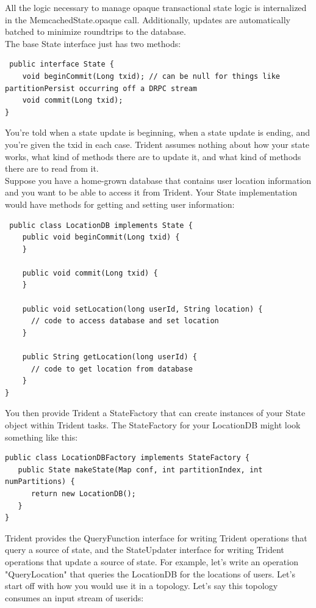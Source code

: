 All the logic necessary to manage opaque transactional state logic is internalized in the MemcachedState.opaque call. Additionally, updates are automatically batched to minimize roundtrips to the database.\\[2mm]
The base State interface just has two methods:\\[2mm]
\begin{verbatim}
 public interface State {
    void beginCommit(Long txid); // can be null for things like partitionPersist occurring off a DRPC stream
    void commit(Long txid);
}
\end{verbatim}
You're told when a state update is beginning, when a state update is ending, and you're given the txid in each case. Trident assumes nothing about how your state works, what kind of methods there are to update it, and what kind of methods there are to read from it.\\[2mm]Suppose you have a home-grown database that contains user location information and you want to be able to access it from Trident. Your State implementation would have methods for getting and setting user information:\\[2mm]
\begin{verbatim}
 public class LocationDB implements State {
    public void beginCommit(Long txid) {    
    }
    
    public void commit(Long txid) {    
    }
    
    public void setLocation(long userId, String location) {
      // code to access database and set location
    }
    
    public String getLocation(long userId) {
      // code to get location from database
    }
}
\end{verbatim}
You then provide Trident a StateFactory that can create instances of your State object within Trident tasks. The StateFactory for your LocationDB might look something like this:\\[2mm]
\begin{verbatim}
public class LocationDBFactory implements StateFactory {
   public State makeState(Map conf, int partitionIndex, int numPartitions) {
      return new LocationDB();
   } 
}
\end{verbatim}
Trident provides the QueryFunction interface for writing Trident operations that query a source of state, and the StateUpdater interface for writing Trident operations that update a source of state. For example, let's write an operation "QueryLocation" that queries the LocationDB for the locations of users. Let's start off with how you would use it in a topology. Let's say this topology consumes an input stream of userids:\\[2mm]
